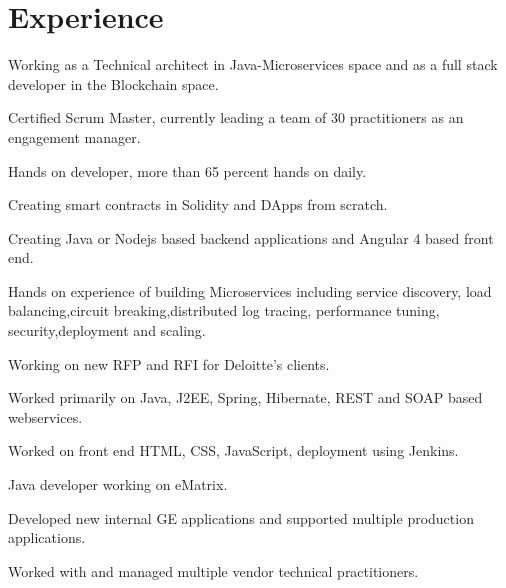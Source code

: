 \documentclass[]{deedy-resume-openfont}
\begin{document}
\begin{minipage}[t]{0.66\textwidth} 


\section{Experience}

\vspace{\topsep} %
\begin{tightemize}
\item Working as a  Technical architect in Java-Microservices space and as a full stack developer in the Blockchain space.
\item Certified Scrum Master, currently leading a team of 30 practitioners as an engagement manager.
\item Hands on developer, more than 65 percent hands on daily.
\item Creating smart contracts in Solidity and DApps from scratch.
\item Creating Java or Nodejs based backend applications and Angular 4 based front end.
\item Hands on experience of building Microservices including service discovery, load balancing,circuit breaking,distributed log tracing, performance tuning, security,deployment and scaling.
\item Working on new RFP and RFI for Deloitte's clients.
\end{tightemize}
\sectionsep

\begin{tightemize}
\item Worked primarily on Java, J2EE, Spring, Hibernate, REST and SOAP based webservices.
\item Worked on front end HTML, CSS, JavaScript, deployment using Jenkins.
\end{tightemize}
\sectionsep

\begin{tightemize}
\item Java developer working on eMatrix.
\item Developed new internal GE applications and supported multiple production applications.
\item Worked with and managed multiple vendor technical practitioners.
\end{tightemize}
\sectionsep


\end{minipage}
\end{document}
